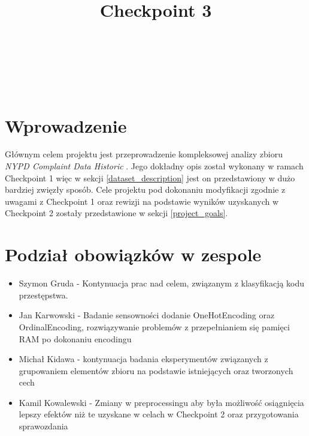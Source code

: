 \documentclass{classrep}
\author{%
    \studentinfo[239661@edu.p.lodz.pl]{Szymon Gruda}{239661}\\
    \studentinfo[239671@edu.p.lodz.pl]{Jan Karwowski}{239671}\\
    \studentinfo[239673@edu.p.lodz.pl]{Michał Kidawa}{239673}\\
    \studentinfo[239676@edu.p.lodz.pl]{Kamil Kowalewski}{239676}\\
}
\title{Checkpoint 3}
\begin{document}
    \maketitle
    \thispagestyle{fancyplain}

    \tableofcontents
    \newpage

    \section{Wprowadzenie} \label{intro} {
        Głównym celem projektu jest przeprowadzenie kompleksowej analizy zbioru
        \textit{NYPD Complaint Data Historic} \cite{nypd_dataset}. Jego dokładny opis
        został wykonany w ramach Checkpoint 1 więc w sekcji \ref{dataset_description}
        jest on przedstawiony w dużo bardziej zwięzły sposób. Cele projektu pod
        dokonaniu modyfikacji zgodnie z uwagami z Checkpoint 1 oraz rewizji na
        podstawie wyników uzyskanych w Checkpoint 2 zostały przedstawione w sekcji
        \ref{project_goals}.
    }

    \section{Podział obowiązków w zespole} {
        \begin{itemize}
            \item Szymon Gruda - Kontynuacja prac nad celem, związanym z klasyfikacją kodu przestępstwa.
            \item Jan Karwowski - Badanie sensowności dodanie OneHotEncoding oraz OrdinalEncoding,
            rozwiązywanie problemów z przepełnianiem się pamięci RAM po dokonaniu encodingu
            \item Michał Kidawa - kontynuacja badania eksperymentów związanych z grupowaniem elementów
            zbioru na podstawie istniejących oraz tworzonych cech
            \item Kamil Kowalewski - Zmiany w preprocessingu aby była możliwość osiągnięcia lepszy efektów
            niż te uzyskane w celach w Checkpoint 2 oraz przygotowania sprawozdania
        \end{itemize}
    }
\end{document}
